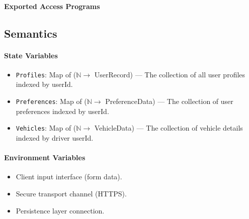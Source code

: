 \paragraph{Exported Access Programs}
\par\vspace{0.5em}

\begin{center}
\end{center}

\subsection{Semantics}

\paragraph{State Variables}
\begin{itemize}
    \item \texttt{Profiles}: Map of ($\mathbb{N} \rightarrow$ UserRecord) --- The collection of all user profiles indexed by userId.
    \item \texttt{Preferences}: Map of ($\mathbb{N} \rightarrow$ PreferenceData) --- The collection of user preferences indexed by userId.
    \item \texttt{Vehicles}: Map of ($\mathbb{N} \rightarrow$ VehicleData) --- The collection of vehicle details indexed by driver userId.
\end{itemize}

\paragraph{Environment Variables}
\begin{itemize}
    \item Client input interface (form data).
    \item Secure transport channel (HTTPS).
    \item Persistence layer connection.
\end{itemize}


